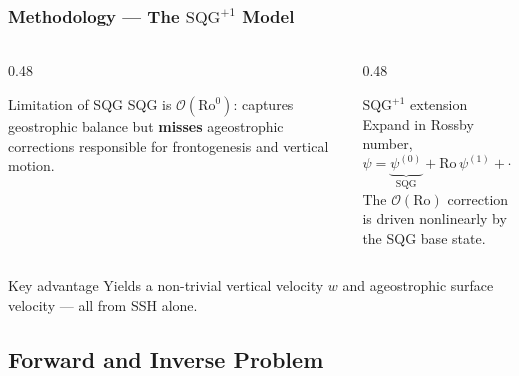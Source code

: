 \documentclass[
	11pt, %
]{beamer}
\newcommand{\SQGp}{$\text{SQG}^{+1}$}
\begin{document}
\begin{frame}
    \frametitle{Methodology --- The \SQGp{} Model}
    \framesubtitle{\cite{muraki1999}}
    \begin{columns}[t]
        \begin{column}{0.48\textwidth}
            \begin{alertblock}{Limitation of SQG}
                SQG is $\mathcal{O}(\mathrm{Ro}^0)$: captures geostrophic balance but \textbf{misses} ageostrophic corrections responsible for frontogenesis and vertical motion.
            \end{alertblock}
        \end{column}
        \begin{column}{0.48\textwidth}
            \begin{block}{\SQGp{} extension}
                Expand in Rossby number,
                \[
                    \psi = \underbrace{\psi^{(0)}}_{\text{SQG}} + \mathrm{Ro}\,\psi^{(1)} + \cdots
                \]
                The $\mathcal{O}(\mathrm{Ro})$ correction is driven nonlinearly by the SQG base state.
            \end{block}
        \end{column}
    \end{columns}
    \vspace{0.5em}
    \begin{exampleblock}{Key advantage}
        Yields a non-trivial vertical velocity $w$ and ageostrophic surface velocity --- all from SSH alone.
    \end{exampleblock}
\end{frame}


\subsection{Forward and Inverse Problem}
\end{document}

